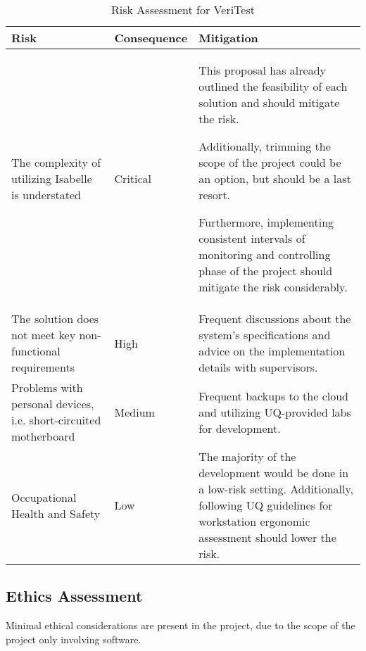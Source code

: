 \begin{table}[h]
    \centering
    \begin{tabular}{|L{0.25\textwidth}|l|L{0.5\textwidth}|}
        \hline
        \textbf{Risk} & \textbf{Consequence} & \textbf{Mitigation} \\
        \hline\hline
        The complexity of utilizing Isabelle is understated & Critical 
            & This proposal has already outlined the feasibility of each solution and should mitigate the risk. 
            
            Additionally, trimming the scope of the project could be an option, but should be a last resort.

            Furthermore, implementing consistent intervals of monitoring and controlling phase of the project should mitigate the 
            risk considerably. \\
        \hline
        The solution does not meet key non-functional requirements & High
            & Frequent discussions about the system's specifications and advice on the implementation details with supervisors. \\
        \hline
        Problems with personal devices, i.e. short-circuited motherboard & Medium
            & Frequent backups to the cloud and utilizing UQ-provided labs for development. \\
        \hline
        Occupational Health and Safety & Low
            & The majority of the development would be done in a low-risk setting. Additionally, following UQ guidelines for 
            workstation ergonomic assessment should lower the risk. \\
        \hline
    \end{tabular}
    \caption{Risk Assessment for VeriTest}
\end{table}

\subsection{Ethics Assessment}

Minimal ethical considerations are present in the project, due to the scope of the project only involving 
software.